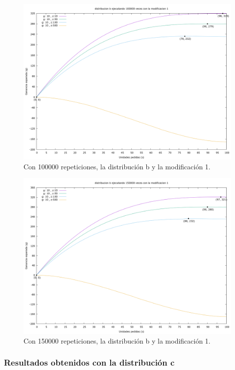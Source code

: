 \documentclass[12pt, spanish]{article}
\begin{document}
\begin{figure}[H]
	\centering
	\includegraphics[scale = 0.3]{prob_b/datos_b_100000_1.png}
	\caption{Con 100000 repeticiones, la distribución b y la modificación 1.}
	\label{fig:ej1_a_100000}

\end{figure}

\begin{figure}[H]
	\centering
	\includegraphics[scale = 0.3]{prob_b/datos_b_150000_1.png}
	\caption{Con 150000 repeticiones, la distribución b y la modificación 1.}
	\label{fig:ej1_a_150000}

\end{figure}

\subsubsection{Resultados obtenidos con la distribución c}
\end{document}
